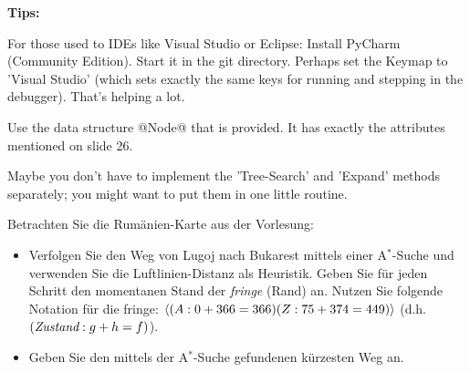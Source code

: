 \textbf{Tips:}
\begin{items}
\item For those used to IDEs like Visual Studio or Eclipse: Install PyCharm (Community Edition). Start it in the git directory. Perhaps set the Keymap to 'Visual Studio' (which sets exactly the same keys for running and stepping in the debugger). That's helping a lot.
\item Use the data structure @Node@ that is provided. It has exactly the attributes mentioned on slide 26.
\item Maybe you don't have to implement the 'Tree-Search' and 'Expand' methods separately; you might want to put them in one little routine.
\end{items}







Betrachten Sie die Rumänien-Karte aus der Vorlesung:


\begin{itemize}
\item
Verfolgen Sie den Weg von Lugoj nach Bukarest mittels einer
A${}^*$-Suche und verwenden Sie die Luftlinien-Distanz als
Heuristik. Geben Sie für jeden Schritt den momentanen Stand
der \emph{fringe} (Rand) an. Nutzen Sie folgende Notation für die
fringe: $\left\langle (A:0 + 366 = 366) (Z:75+374 = 449) \right\rangle$ (d.h. $(\emph{Zustand}:g+h=f)$).
\item
Geben Sie den mittels der A${}^*$-Suche gefundenen kürzesten Weg an.
\end{itemize}

